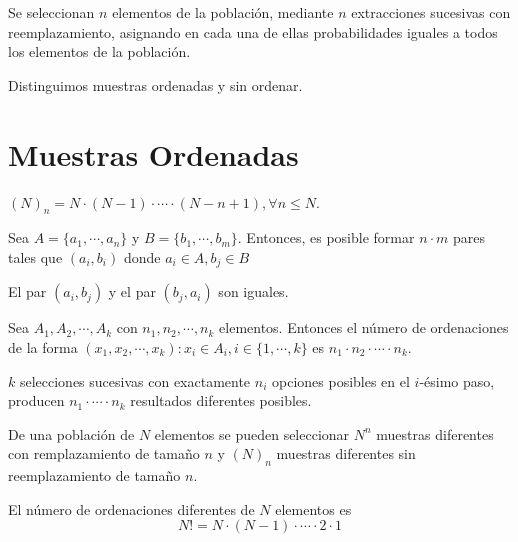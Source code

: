 \begin{defn}
  Se seleccionan $n$ elementos de la población, mediante $n$ extracciones sucesivas con reemplazamiento, asignando en cada una de ellas probabilidades iguales a todos los elementos de la población.
\end{defn}

\begin{note}
  Distinguimos muestras ordenadas y sin ordenar.
\end{note}

\section{Muestras Ordenadas}

\begin{nota}
  $(N)_{n} = N \cdot (N-1) \cdot \cdots \cdot (N- n +1), \forall n \leq N$.
\end{nota}

\begin{prop}
  Sea $A = \{ a_{1}, \cdots, a_{n} \}$ y $B = \{ b_{1}, \cdots, b_{m} \}$. Entonces, es posible formar $n \cdot m$ pares tales que $(a_{i}, b_{i})$ donde $a_{i} \in A, b_{j} \in B$
\end{prop}

\begin{obs}
  El par $(a_{i}, b_{j})$ y el par $(b_{j}, a_{i})$ son iguales.
\end{obs}

\begin{prop}
  Sea $A_{1}, A_{2}, \cdots, A_{k}$ con $n_{1}, n_{2}, \cdots, n_{k}$ elementos. Entonces el número de ordenaciones de la forma $(x_{1}, x_{2}, \cdots, x_{k}) : x_{i} \in A_{i}, i \in \{ 1, \cdots, k \}$ es $n_{1} \cdot n_{2} \cdot \cdots \cdot n_{k}$.
\end{prop}

\begin{cor}
  $k$ selecciones sucesivas con exactamente $n_{i}$ opciones posibles en el $i$-ésimo paso, producen $n_{1} \cdot \cdots \cdot n_{k}$ resultados diferentes posibles.
\end{cor}

\begin{theo}
  De una población de $N$ elementos se pueden seleccionar $N^{n}$ muestras diferentes con remplazamiento de tamaño $n$ y $(N)_{n}$ muestras diferentes sin reemplazamiento de tamaño $n$.
\end{theo}

\begin{theo}
  El número de ordenaciones diferentes de $N$ elementos es 
  \[ 
    N! = N \cdot (N -1) \cdot \cdots \cdot 2 \cdot 1 
  \] 
\end{theo}

